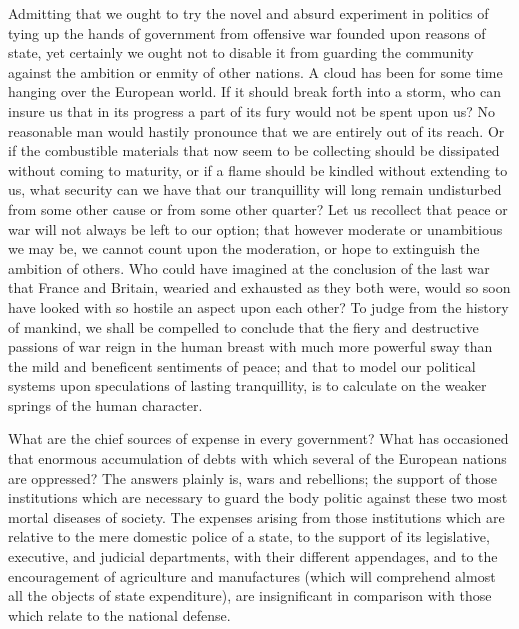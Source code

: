 Admitting that we ought to try the novel and absurd experiment in politics of tying up the hands of government from offensive war founded upon reasons of state, yet certainly we ought not to disable it from guarding the community against the ambition or enmity of other nations. 
A cloud has been for some time hanging over the European world. 
If it should break forth into a storm, who can insure us that in its progress a part of its fury would not be spent upon us? 
No reasonable man would hastily pronounce that we are entirely out of its reach. 
Or if the combustible materials that now seem to be collecting should be dissipated without coming to maturity, or if a flame should be kindled without extending to us, what security can we have that our tranquillity will long remain undisturbed from some other cause or from some other quarter? 
Let us recollect that peace or war will not always be left to our option; that however moderate or unambitious we may be, we cannot count upon the moderation, or hope to extinguish the ambition of others. 
Who could have imagined at the conclusion of the last war that France and Britain, wearied and exhausted as they both were, would so soon have looked with so hostile an aspect upon each other? 
To judge from the history of mankind, we shall be compelled to conclude that the fiery and destructive passions of war reign in the human breast with much more powerful sway than the mild and beneficent sentiments of peace; and that to model our political systems upon speculations of lasting tranquillity, is to calculate on the weaker springs of the human character.

What are the chief sources of expense in every government? 
What has occasioned that enormous accumulation of debts with which several of the European nations are oppressed? 
The answers plainly is, wars and rebellions; the support of those institutions which are necessary to guard the body politic against these two most mortal diseases of society. 
The expenses arising from those institutions which are relative to the mere domestic police of a state, to the support of its legislative, executive, and judicial departments, with their different appendages, and to the encouragement of agriculture and manufactures (which will comprehend almost all the objects of state expenditure), are insignificant in comparison with those which relate to the national defense.

